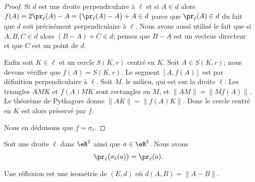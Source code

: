 \begin{proof}
	Si \( d\) est une droite perpendiculaire à \( \ell\) et si \( A\in d\) alors \( f(A)=2\pr_{\ell}(A)-A=  \big( \pr_{\ell}(A)-A \big)+A\in d  \) parce que \( \pr_{\ell}(A)\in d\) du fait que \( d\) soit précisément perpendiculaire à \( \ell\). Nous avons aussi utilisé le fait que si \( A,B,C\in d\) alors \( (B-A)+C\in d\); pensez que \( B-A\) est un vecteur directeur et que \( C\) est un point de \( d\).

	Enfin soit \( K\in\ell\) et un cercle \( S(K,r)\) centré en \( K\). Soit \( A\in S(K,r)\); nous devons vérifier que \( f(A)=S(K,r)\). Le segment \( [A,f(A)]\) est par définition perpendiculaire à \( \ell\). Soit \( M\), le milieu, qui est sur la droite \( \ell\). Les triangles \( AMK\) et \( f(A)MK\) sont rectangles en \( M\), et \( \| AM \|=\| Mf(A) \|\). Le théorème de Pythagore donne \( \| AK \|=\| f(A)K \|\). Donc le cercle centré en \( K\) est alors préservé par \( f\).

	Nous en déduisons que \( f=\sigma_{\ell}\).
\end{proof}

\begin{lemma}       \label{LEMooNYIWooXanBXh}
    Soit une droite \( \ell\) dans \( \eR^2\) ainsi que \( a\in \eR^2\). Nous avons
    \begin{equation}
        \pr_{\ell}\big( \sigma_{\ell}(a) \big)=\pr_{\ell}(a).
    \end{equation}
\end{lemma}

\begin{proposition}      \label{PROPooFSVEooWmJsnv}
	Une réflexion est une isométrie de \( (E,d)\) où \( d(A,B)=\| A-B \|\).
\end{proposition}

